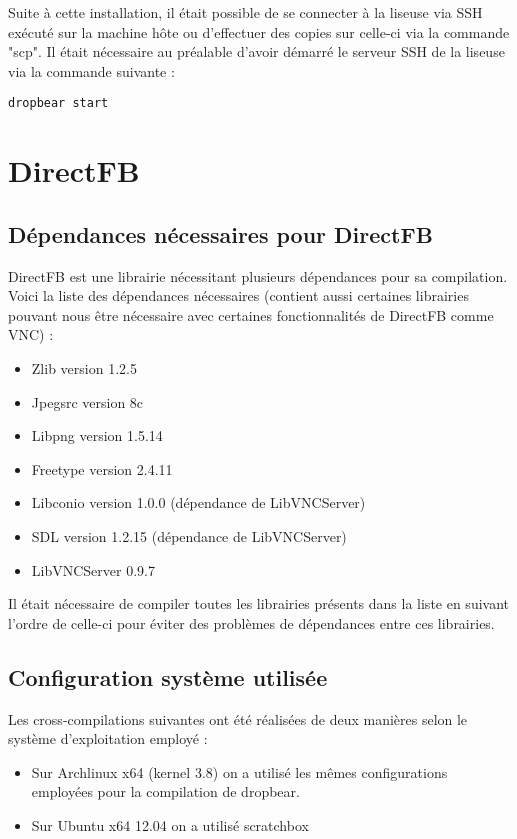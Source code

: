 Suite à cette installation, il était possible de se connecter à la liseuse via SSH exécuté sur la machine hôte ou d'effectuer des copies sur celle-ci via la commande "scp". Il était nécessaire au préalable d'avoir démarré le serveur SSH de la liseuse via la commande suivante :

\begin{lstlisting}
dropbear start
\end{lstlisting}

\newpage


\section{DirectFB}

\subsection{Dépendances nécessaires pour DirectFB}

DirectFB est une librairie nécessitant plusieurs dépendances pour sa compilation. Voici la liste des dépendances nécessaires (contient aussi certaines librairies pouvant nous être nécessaire avec certaines fonctionnalités de DirectFB comme VNC) :

\begin{itemize}
\item Zlib version 1.2.5
\item Jpegsrc version 8c
\item Libpng version 1.5.14
\item Freetype version 2.4.11
\item Libconio version 1.0.0 (dépendance de LibVNCServer)
\item SDL version 1.2.15 (dépendance de LibVNCServer)
\item LibVNCServer 0.9.7
\end{itemize}

Il était nécessaire de compiler toutes les librairies présents dans la liste en suivant l'ordre de celle-ci pour éviter des problèmes de dépendances entre ces librairies.

\subsection{Configuration système utilisée}
Les cross-compilations suivantes ont été réalisées de deux manières selon le système d'exploitation employé : 

\begin{itemize}
\item Sur Archlinux x64 (kernel 3.8) on a utilisé les mêmes configurations employées pour la compilation de dropbear.
\item Sur Ubuntu x64 12.04 on a utilisé scratchbox %
\end{itemize}

